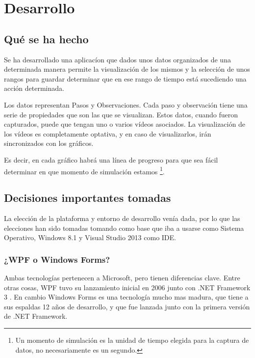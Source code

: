 \chapter{Desarrollo}

\section{Qu\'{e} se ha hecho}
Se ha desarrollado una aplicac\'{i}on que dados unos datos organizados
de una determinada manera permite la visualizaci\'{o}n de los mismos y
la selecci\'{o}n de unos rangos para guardar determinar que en ese rango de tiempo
est\'{a} sucediendo una acci\'{o}n determinada.

Los datos representan Pasos y Observaciones. Cada paso y observaci\'{o}n tiene una serie
de propiedades que son las que se visualizan. Estos datos, cuando fueron capturados, puede
que tengan uno o varios v\'{i}deos asociados. La visualizaci\'{o}n de los v\'{i}deos es completamente
optativa, y en caso de visualizarlos, ir\'{a}n sincronizados con los gr\'{a}ficos.

Es decir, en cada gr\'{a}fico habr\'{a} una l\'{i}nea de progreso para que sea f\'{a}cil determinar en que momento
de simulaci\'{o}n estamos \footnote{Un momento de simulaci\'{o}n es la unidad de tiempo elegida para la captura de datos, no
    necesariamente es un segundo.}.

\section{Decisiones importantes tomadas}
La elecci\'{o}n de la plataforma y entorno de desarrollo ven\'{i}a dada, por lo que las elecciones han sido tomadas
tomando como base que iba a usarse como Sistema Operativo, Windows 8.1 y Visual Studio 2013 como IDE.

\subsection{¿WPF o Windows Forms?}
Ambas tecnolog\'{i}as pertenecen a Microsoft, pero tienen diferencias clave. Entre otras cosas, WPF tuvo su lanzamiento inicial en 2006
junto con .NET Framework 3 \cite{WPF:Overview}. En cambio Windows Forms es una tecnolog\'{i}a 
mucho mas madura, que tiene a sus espaldas 12 años de desarrollo, y que fue lanzada junto con la primera versi\'{o}n de .NET Framework.

